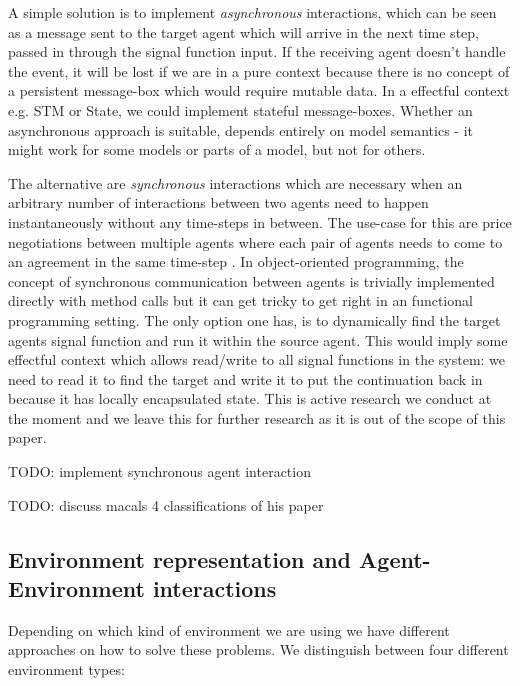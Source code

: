 A simple solution is to implement \textit{asynchronous} interactions, which can be seen as a message sent to the target agent which will arrive in the next time step, passed in through the signal function input. If the receiving agent doesn't handle the event, it will be lost if we are in a pure context because there is no concept of a persistent message-box which would require mutable data. In a effectful context e.g. STM or State, we could implement stateful message-boxes. Whether an asynchronous approach is suitable, depends entirely on model semantics - it might work for some models or parts of a model, but not for others.

The alternative are \textit{synchronous} interactions which are necessary when an arbitrary number of interactions between two agents need to happen instantaneously without any time-steps in between. The use-case for this are price negotiations between multiple agents where each pair of agents needs to come to an agreement in the same time-step \cite{epstein_growing_1996}. In object-oriented programming, the concept of synchronous communication between agents is trivially implemented directly with method calls but it can get tricky to get right in an functional programming setting. The only option one has, is to dynamically find the target agents signal function and run it within the source agent. This would imply some effectful context which allows read/write to all signal functions in the system: we need to read it to find the target and write it to put the continuation back in because it has locally encapsulated state. This is active research we conduct at the moment and we leave this for further research as it is out of the scope of this paper.

TODO: implement synchronous agent interaction

TODO: discuss macals 4 classifications of his paper  \cite{macal_everything_2016} 

\subsection{Environment representation and Agent-Environment interactions}
Depending on which kind of environment we are using we have different approaches on how to solve these problems. We distinguish between four different environment types:

